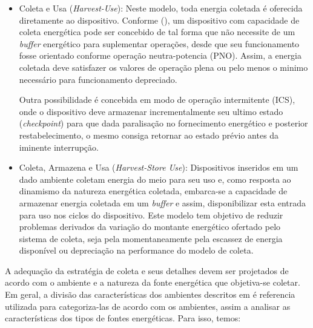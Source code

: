 \begin{itemize}
    \item Coleta e Usa (\textit{Harvest-Use}): Neste modelo, toda energia coletada é oferecida diretamente ao dispositivo. Conforme \citeauthor{merrett_energy-driven_2017}(\citeyear{merrett_energy-driven_2017}), um dispositivo com capacidade de coleta energética pode ser concebido de tal forma que não necessite de um \textit{buffer} energético para suplementar operações, desde que seu funcionamento fosse orientado conforme operação neutra-potencia (\acl{PNO}). Assim, a energia coletada deve satisfazer os valores de operação plena ou pelo menos o minimo necessário para funcionamento depreciado.
    
     Outra possibilidade é concebida em modo de operação intermitente (\acl{ICS}), onde o dispositivo deve armazenar incrementalmente seu ultimo estado (\textit{checkpoint}) para que dada paralisação no fornecimento energético e posterior restabelecimento, o mesmo consiga retornar ao estado prévio antes da iminente interrupção. 
        
    \item Coleta, Armazena e Usa (\textit{Harvest-Store Use}): Dispositivos inseridos em um dado ambiente coletam energia do meio para seu uso e, como resposta ao dinamismo da natureza energética coletada, embarca-se a capacidade de armazenar energia coletada em um \textit{buffer} e assim, disponibilizar esta entrada para uso nos ciclos do dispositivo. Este modelo tem objetivo de reduzir problemas derivados da variação do montante energético ofertado pelo sistema de coleta, seja pela momentaneamente pela escassez de energia disponível ou depreciação na performance do modelo de coleta.
    
\end{itemize}


 A adequação da estratégia de coleta e seus detalhes devem ser projetados de acordo com o ambiente e a natureza da fonte energética que objetiva-se coletar. Em geral, a divisão das características dos ambientes descritos em \cite{shaikh_energy_2016} é referencia utilizada para categoriza-las de acordo com os ambientes, assim a analisar as características dos tipos de fontes energéticas. Para isso, temos:


